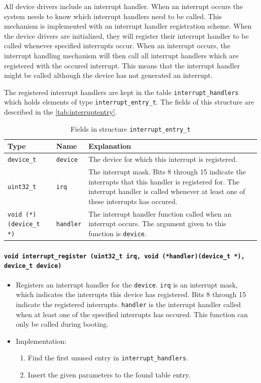 \documentclass[twoside,a4paper]{report}
\makeatletter
\newcommand{\PBS}[1]{\let\temp=\\#1\let\\=\temp}
\newlength{\tablewidth}
\newenvironment{function}[3]{%
\paragraph{\texttt{#1 {\textbf{#2}} (#3)}}%
\index{#2@\texttt{#2}}%
\begin{itemize}%
}{%
\end{itemize}%
}
\newenvironment{structdescription}{%
\begin{center}%
\begin{tabular}{p{3.5cm}|p{2.5cm}|>{\PBS\raggedright}p{\tablewidth-6\tabcolsep-6cm}}%
\textbf{Type} & \textbf{Name} & \textbf{Explanation} \\ %
}{%
\end{tabular}%
\end{center}%
}
\newcommand{\structfield}[3]{%
\hline%
\texttt{#1} & \texttt{#2} & #3 \\%
}
\newcommand{\brtab}{\\\hspace*{1cm}}
\makeatother
\begin{document}
All device drivers include an interrupt handler. When an interrupt
occurs the system needs to know which interrupt handlers need to be
called. This mechanism is implemented with an interrupt handler
registration scheme. When the device drivers are initialized, they
will register their interrupt handler to be called whenever
specified interrupts occur. When an interrupt occurs, the interrupt
handling mechanism will then call all interrupt handlers which are
registered with the occured interrupt. This means that the interrupt
handler might be called although the device has not generated an
interrupt.


The registered interrupt handlers are kept in the table
\texttt{interrupt\_handlers} which holds elements of type
\texttt{interrupt\_entry\_t}. The fields of this structure are
described in the \autoref{tab:interruptentry}.

\begin{table}
\begin{structdescription}

\structfield{device\_t}{device}{The device for which this interrupt is
registered.}

\structfield{uint32\_t}{irq}{The interrupt mask. Bits 8 through 15
  indicate the interrupts that this handler is registered for. The
  interrupt handler is called whenever at least one of these
  interrupts has occured.}

\structfield{void (*)(device\_t *)}{handler}{The interrupt handler
  function called when an interrupt occurs. The argument given to
  this function is \texttt{device}.}

\end{structdescription}
\caption{Fields in structure \texttt{interrupt\_entry\_t}}
\label{tab:interruptentry}
\end{table}

\begin{function}{void}{interrupt\_register}{uint32\_t irq, void
    (*handler)(device\_t *),\brtab device\_t device}
\item Registers an interrupt handler for the \texttt{device}.
  \texttt{irq} is an interrupt mask, which indicates the interrupts
  this device has registered. Bits 8 through 15 indicate the registered
  interrupts. \texttt{handler} is the interrupt handler called when at
  least one of the specified interrupts has occured. This function can
  only be called during booting.
\item Implementation:
\begin{enumerate}
\item Find the first unused entry in \texttt{interrupt\_handlers}.
\item Insert the given parameters to the found table entry.
\end{enumerate}
\end{function}
\end{document}
